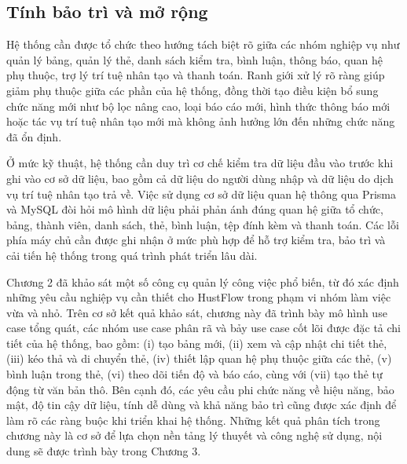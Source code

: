 \documentclass[../DoAn.tex]{subfiles}
\begin{document}
\subsection{Tính bảo trì và mở rộng}
\label{subsection:2.4.5}

Hệ thống cần được tổ chức theo hướng tách biệt rõ giữa các nhóm nghiệp vụ như quản lý bảng, quản lý thẻ, danh sách kiểm tra, bình luận, thông báo, quan hệ phụ thuộc, trợ lý trí tuệ nhân tạo và thanh toán. Ranh giới xử lý rõ ràng giúp giảm phụ thuộc giữa các phần của hệ thống, đồng thời tạo điều kiện bổ sung chức năng mới như bộ lọc nâng cao, loại báo cáo mới, hình thức thông báo mới hoặc tác vụ trí tuệ nhân tạo mới mà không ảnh hưởng lớn đến những chức năng đã ổn định.

Ở mức kỹ thuật, hệ thống cần duy trì cơ chế kiểm tra dữ liệu đầu vào trước khi ghi vào cơ sở dữ liệu, bao gồm cả dữ liệu do người dùng nhập và dữ liệu do dịch vụ trí tuệ nhân tạo trả về. Việc sử dụng cơ sở dữ liệu quan hệ thông qua Prisma và MySQL đòi hỏi mô hình dữ liệu phải phản ánh đúng quan hệ giữa tổ chức, bảng, thành viên, danh sách, thẻ, bình luận, tệp đính kèm và thanh toán. Các lỗi phía máy chủ cần được ghi nhận ở mức phù hợp để hỗ trợ kiểm tra, bảo trì và cải tiến hệ thống trong quá trình phát triển lâu dài.


Chương 2 đã khảo sát một số công cụ quản lý công việc phổ biến, từ đó xác định những yêu cầu nghiệp vụ cần thiết cho HustFlow trong phạm vi nhóm làm việc vừa và nhỏ. Trên cơ sở kết quả khảo sát, chương này đã trình bày mô hình use case tổng quát, các nhóm use case phân rã và bảy use case cốt lõi được đặc tả chi tiết của hệ thống, bao gồm: (i) tạo bảng mới, (ii) xem và cập nhật chi tiết thẻ, (iii) kéo thả và di chuyển thẻ, (iv) thiết lập quan hệ phụ thuộc giữa các thẻ, (v) bình luận trong thẻ, (vi) theo dõi tiến độ và báo cáo, cùng với (vii) tạo thẻ tự động từ văn bản thô. Bên cạnh đó, các yêu cầu phi chức năng về hiệu năng, bảo mật, độ tin cậy dữ liệu, tính dễ dùng và khả năng bảo trì cũng được xác định để làm rõ các ràng buộc khi triển khai hệ thống. Những kết quả phân tích trong chương này là cơ sở để lựa chọn nền tảng lý thuyết và công nghệ sử dụng, nội dung sẽ được trình bày trong Chương 3.
\end{document}
